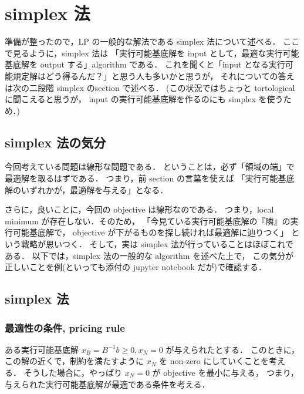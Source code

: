 \documentclass[11pt, a4]{article}
\begin{document}
\section{simplex 法}

準備が整ったので，LP の一般的な解法である simplex 法について述べる．
ここで見るように，simplex 法は
「実行可能基底解を input として，最適な実行可能基底解を output する」algorithm である．
これを聞くと「input となる実行可能規定解はどう得るんだ？」と思う人も多いかと思うが，
それについての答えは次の二段階 simplex のsection で述べる．
(この状況ではちょっと tortological に聞こえると思うが，
input の実行可能基底解を作るのにも simplex を使うため．)

\subsection{simplex 法の気分}
今回考えている問題は線形な問題である．
ということは，必ず「領域の端」で最適解を取るはずである．
つまり，前 section の言葉を使えば
「実行可能基底解のいずれかが，最適解を与える」となる．

さらに，良いことに，今回の objective は線形なのである．
つまり，local minimum が存在しない．そのため，
「今見ている実行可能基底解の『隣』の実行可能基底解で，
objective が下がるものを探し続ければ最適解に辿りつく」
という戦略が思いつく．
そして，実は simplex 法が行っていることはほぼこれである．
以下では，simplex 法の一般的な algorithm を述べた上で，
この気分が正しいことを例(といっても添付の jupyter notebook だが)で確認する．

\subsection{simplex 法}
\subsubsection{最適性の条件, pricing rule}
ある実行可能基底解 $x_B = B^{-1}b \geq 0, x_N = 0$ が与えられたとする．
このときに，この解の近くで，制約を満たすように $x_N$ を non-zero にしていくことを考える．
そうした場合に，やっぱり $x_N = 0$ が objective を最小に与える，
つまり，与えられた実行可能基底解が最適である条件を考える．
\end{document}
